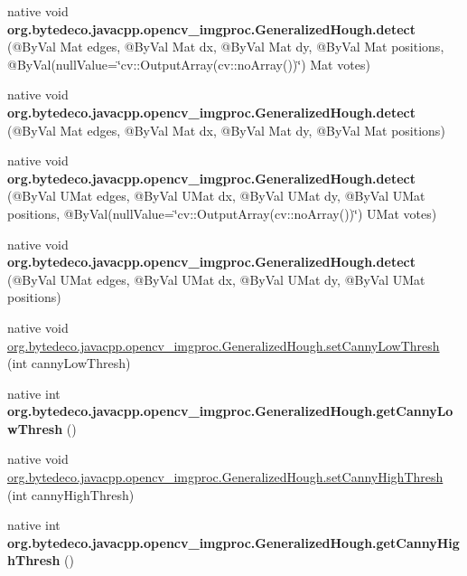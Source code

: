 \begin{DoxyCompactItemize}
\mbox{\label{group__imgproc_gae9f1d2c4478fd9457de123d9e48f52b8}} 
native void {\bfseries org.\+bytedeco.\+javacpp.\+opencv\+\_\+imgproc.\+Generalized\+Hough.\+detect} (@By\+Val Mat edges, @By\+Val Mat dx, @By\+Val Mat dy, @By\+Val Mat positions, @By\+Val(null\+Value=\char`\"{}cv\+::\+Output\+Array(cv\+::no\+Array())\char`\"{}) Mat votes)
\item 
\mbox{\label{group__imgproc_gadcde2aa9b6941cf3ccfc35b413a1f944}} 
native void {\bfseries org.\+bytedeco.\+javacpp.\+opencv\+\_\+imgproc.\+Generalized\+Hough.\+detect} (@By\+Val Mat edges, @By\+Val Mat dx, @By\+Val Mat dy, @By\+Val Mat positions)
\item 
\mbox{\label{group__imgproc_gac8fecc099b596cdbe4028d668608a21c}} 
native void {\bfseries org.\+bytedeco.\+javacpp.\+opencv\+\_\+imgproc.\+Generalized\+Hough.\+detect} (@By\+Val U\+Mat edges, @By\+Val U\+Mat dx, @By\+Val U\+Mat dy, @By\+Val U\+Mat positions, @By\+Val(null\+Value=\char`\"{}cv\+::\+Output\+Array(cv\+::no\+Array())\char`\"{}) U\+Mat votes)
\item 
\mbox{\label{group__imgproc_ga474783ec5e3bebdef81ccea25f920db0}} 
native void {\bfseries org.\+bytedeco.\+javacpp.\+opencv\+\_\+imgproc.\+Generalized\+Hough.\+detect} (@By\+Val U\+Mat edges, @By\+Val U\+Mat dx, @By\+Val U\+Mat dy, @By\+Val U\+Mat positions)
\item 
native void \hyperlink{group__imgproc_ga730f9badfb99e9689367d51afa76ef94}{org.\+bytedeco.\+javacpp.\+opencv\+\_\+imgproc.\+Generalized\+Hough.\+set\+Canny\+Low\+Thresh} (int canny\+Low\+Thresh)
\item 
\mbox{\label{group__imgproc_ga7306dbb0a220684c9a70d16c310c0b24}} 
native int {\bfseries org.\+bytedeco.\+javacpp.\+opencv\+\_\+imgproc.\+Generalized\+Hough.\+get\+Canny\+Low\+Thresh} ()
\item 
native void \hyperlink{group__imgproc_gaa001df9ff64a9ea3e521e5218702134f}{org.\+bytedeco.\+javacpp.\+opencv\+\_\+imgproc.\+Generalized\+Hough.\+set\+Canny\+High\+Thresh} (int canny\+High\+Thresh)
\item 
\mbox{\label{group__imgproc_gacbf4baab7a5d47be67d6cd27ac297a49}} 
native int {\bfseries org.\+bytedeco.\+javacpp.\+opencv\+\_\+imgproc.\+Generalized\+Hough.\+get\+Canny\+High\+Thresh} ()

\end{DoxyCompactItemize}
